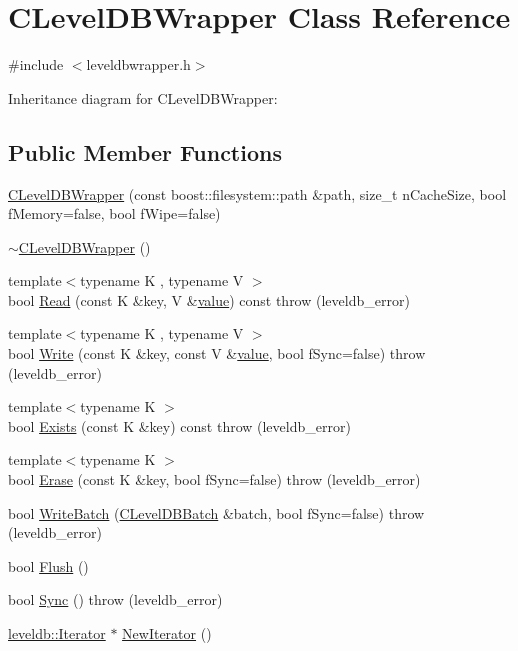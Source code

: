 \hypertarget{class_c_level_d_b_wrapper}{}\section{C\+Level\+D\+B\+Wrapper Class Reference}
\label{class_c_level_d_b_wrapper}


{\ttfamily \#include $<$leveldbwrapper.\+h$>$}



Inheritance diagram for C\+Level\+D\+B\+Wrapper\+:
\subsection*{Public Member Functions}
\begin{DoxyCompactItemize}
\item 
\hyperlink{class_c_level_d_b_wrapper_ae796b1190c072df6275e0ada4d187943}{C\+Level\+D\+B\+Wrapper} (const boost\+::filesystem\+::path \&path, size\+\_\+t n\+Cache\+Size, bool f\+Memory=false, bool f\+Wipe=false)
\item 
\hyperlink{class_c_level_d_b_wrapper_a7ffe7edeadfcf521d32509216e95403b}{$\sim$\+C\+Level\+D\+B\+Wrapper} ()
\item 
{\footnotesize template$<$typename K , typename V $>$ }\\bool \hyperlink{class_c_level_d_b_wrapper_aa3b816ae43c930b4bf1f85461bff4b5b}{Read} (const K \&key, V \&\hyperlink{cache_8cc_a0f61d63b009d0880a89c843bd50d8d76}{value}) const   throw (leveldb\+\_\+error)
\item 
{\footnotesize template$<$typename K , typename V $>$ }\\bool \hyperlink{class_c_level_d_b_wrapper_a740caa1aefbafc888838ea7f70dc31f4}{Write} (const K \&key, const V \&\hyperlink{cache_8cc_a0f61d63b009d0880a89c843bd50d8d76}{value}, bool f\+Sync=false)  throw (leveldb\+\_\+error)
\item 
{\footnotesize template$<$typename K $>$ }\\bool \hyperlink{class_c_level_d_b_wrapper_a9c9d2e1c06c45c5d6883f33136f6718b}{Exists} (const K \&key) const   throw (leveldb\+\_\+error)
\item 
{\footnotesize template$<$typename K $>$ }\\bool \hyperlink{class_c_level_d_b_wrapper_a9f67e2880ba191fdc9439ba34e315d72}{Erase} (const K \&key, bool f\+Sync=false)  throw (leveldb\+\_\+error)
\item 
bool \hyperlink{class_c_level_d_b_wrapper_a820484c9e427f9e3400396e750acf4b8}{Write\+Batch} (\hyperlink{class_c_level_d_b_batch}{C\+Level\+D\+B\+Batch} \&batch, bool f\+Sync=false)  throw (leveldb\+\_\+error)
\item 
bool \hyperlink{class_c_level_d_b_wrapper_a639fbfd6652941a1ab570c202197a32a}{Flush} ()
\item 
bool \hyperlink{class_c_level_d_b_wrapper_abd05e914893cd610e8444871f829d8c9}{Sync} ()  throw (leveldb\+\_\+error)
\item 
\hyperlink{classleveldb_1_1_iterator}{leveldb\+::\+Iterator} $\ast$ \hyperlink{class_c_level_d_b_wrapper_a5f43d01a8a6b26464b875d190e002d74}{New\+Iterator} ()
\end{DoxyCompactItemize}


